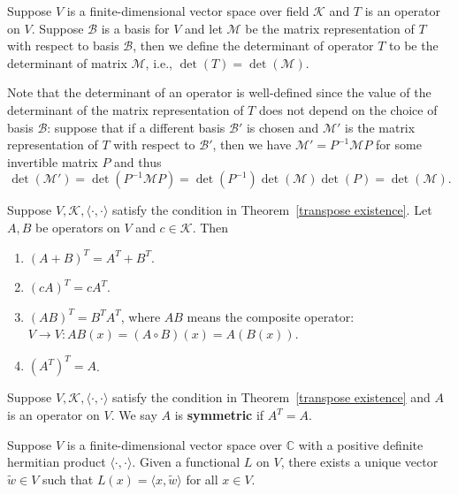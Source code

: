 \documentclass{ctexart}
\newcommand{\C}{\mathbb{C}}
\begin{document}
    \begin{mydef}
        Suppose $V$ is a finite-dimensional vector space over field $\mathcal{K}$ and $T$ is an operator on $V$. Suppose $\mathcal{B}$ is a basis for $V$ and let $\mathcal{M}$ be the matrix representation of $T$ with respect to basis $\mathcal{B}$, then we define the determinant of operator $T$ to be the determinant of matrix $\mathcal{M}$, i.e., $\det(T) = \det(\mathcal{M})$.
    \end{mydef}
    \begin{myrmk}
        Note that the determinant of an operator is well-defined since the value of the determinant of the matrix representation of $T$ does not depend on the choice of basis $\mathcal{B}$: suppose that if a different basis $\mathcal{B}'$ is chosen and $\mathcal{M}'$ is the matrix representation of $T$ with respect to $\mathcal{B}'$, then we have $\mathcal{M}' = P^{-1} \mathcal{M} P$ for some invertible matrix $P$ and thus $$\det(\mathcal{M}') = \det(P^{-1} \mathcal{M} P) = \det(P^{-1}) \det(\mathcal{M}) \det(P) = \det(\mathcal{M}).$$
    \end{myrmk}
    \begin{mythm}
        Suppose $V,\mathcal{K}, \langle \cdot, \cdot \rangle$ satisfy the condition in Theorem~\ref{transpose existence}. Let $A,B$ be operators on $V$ and $c\in \mathcal{K}$. Then
        \begin{enumerate}
            \item $(A+B)^T = A^T + B^T$.
            \item $(cA)^T = c A^T$.
            \item $(AB)^T = B^T A^T$, where $AB$ means the composite operator: $V\to V: AB(x) = (A\circ B)(x) = A(B(x))$.
            \item $(A^T)^T = A$.
        \end{enumerate}
    \end{mythm}
    \begin{mydef}
        Suppose $V,\mathcal{K}, \langle \cdot, \cdot \rangle$ satisfy the condition in Theorem~\ref{transpose existence} and $A$ is an operator on $V$. We say $A$ is \textbf{symmetric} if $A^T = A$.
    \end{mydef}
    \begin{mylma}\label{unique vector for functional}
        Suppose $V$ is a finite-dimensional vector space over $\C$ with a positive definite hermitian product $\langle \cdot, \cdot \rangle$. Given a functional $L$ on $V$, there exists a unique vector $\tilde{w} \in V$ such that $L(x) = \langle x, \tilde{w} \rangle$ for all $x\in V$.
    \end{mylma}
\end{document}

